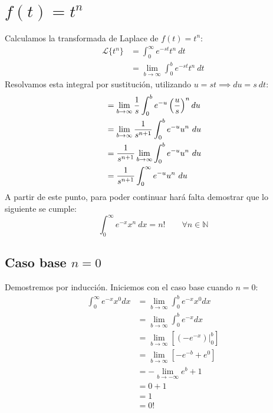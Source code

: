 \documentclass[12pt, a4paper]{article}
\begin{document}
\section{\texorpdfstring{\(f(t)=t^n \)}{f (t) = t n}}

Calculamos la transformada de Laplace de \(f(t) = t^{n}\):
\begin{align*}
    \mathcal{L}\{t^n\}&=\int_0^\infty e^{-st}t^n\ dt\\
    &=\lim_{b\to\infty}\int_0^b e^{-st}t^n\ dt
\end{align*}
Resolvamos esta integral por sustitución, utilizando \(u = st \implies du = s\ dt\):
\begin{align} \label{eq:orig-laplace}
    &=\lim_{b\to\infty} \frac{1}{s} \int_0^b e^{-u}\left(\frac{u}{s}\right)^n du \notag \\
    &=\lim_{b\to\infty} \frac{1}{s^{n+1}} \int_0^b e^{-u} u^{n}\ du \notag \\
    &= \frac{1}{s^{n+1}} \lim_{b\to\infty} \int_0^b e^{-u} u^{n}\ du \notag \\
    &= \frac{1}{s^{n+1}} \int_0^\infty e^{-u} u^{n}\ du
\end{align}
A partir de este punto, para poder continuar hará falta demostrar que lo siguiente se cumple:
\begin{equation} \label{eq:n-fact}
    \int_0^\infty e^{-x}x^n\ dx = n! \qquad \forall n \in \mathbb{N}
\end{equation}

\subsection{Caso base \texorpdfstring{\(n = 0\)}{n = 0}}

Demostremos por inducción. Iniciemos con el caso base cuando \(n = 0\):
\begin{align*}
	\int_0^\infty e^{-x}x^0dx&=\lim_{b\to\infty}\int_0^b e^{-x}x^0dx\\
	&=\lim_{b\to\infty}\int_0^b e^{-x}dx\\
	&=\lim_{b\to\infty} \left[ \left. \left( -e^{-x} \right) \right|_0^b \right] \\
	&=\lim_{b\to\infty} \left[ -e^{-b}+e^{0} \right] \\
	&= - \lim_{b\to- \infty} e^{b} + 1 \\
	&= 0+1 \\
	&= 1 \\
	&= 0!
\end{align*}
\end{document}
